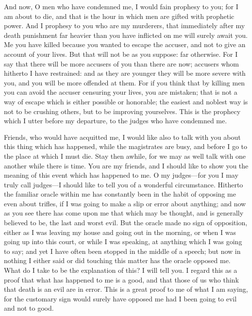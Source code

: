 \documentclass[12pt]{article}
\begin{document}
And now, O men who have condemned me, I would fain prophesy to you;
for I am about to die, and that is the hour in which men are gifted
with prophetic power. And I prophesy to you who are my murderers,
that immediately after my death punishment far heavier than you have
inflicted on me will surely await you. Me you have killed because
you wanted to escape the accuser, and not to give an account of your
lives. But that will not be as you suppose: far otherwise. For I say
that there will be more accusers of you than there are now; accusers
whom hitherto I have restrained: and as they are younger they will
be more severe with you, and you will be more offended at them. For
if you think that by killing men you can avoid the accuser censuring
your lives, you are mistaken; that is not a way of escape which is
either possible or honorable; the easiest and noblest way is not to
be crushing others, but to be improving yourselves. This is the prophecy
which I utter before my departure, to the judges who have condemned
me.

Friends, who would have acquitted me, I would like also to talk with
you about this thing which has happened, while the magistrates are
busy, and before I go to the place at which I must die. Stay then
awhile, for we may as well talk with one another while there is time.
You are my friends, and I should like to show you the meaning of this
event which has happened to me. O my judges---for you I may truly
call judges---I should like to tell you of a wonderful circumstance.
Hitherto the familiar oracle within me has constantly been in the
habit of opposing me even about trifles, if I was going to make a
slip or error about anything; and now as you see there has come upon
me that which may be thought, and is generally believed to be, the
last and worst evil. But the oracle made no sign of opposition, either
as I was leaving my house and going out in the morning, or when I
was going up into this court, or while I was speaking, at anything
which I was going to say; and yet I have often been stopped in the
middle of a speech; but now in nothing I either said or did touching
this matter has the oracle opposed me. What do I take to be the explanation
of this? I will tell you. I regard this as a proof that what has happened
to me is a good, and that those of us who think that death is an evil
are in error. This is a great proof to me of what I am saying, for
the customary sign would surely have opposed me had I been going to
evil and not to good.
\end{document}
